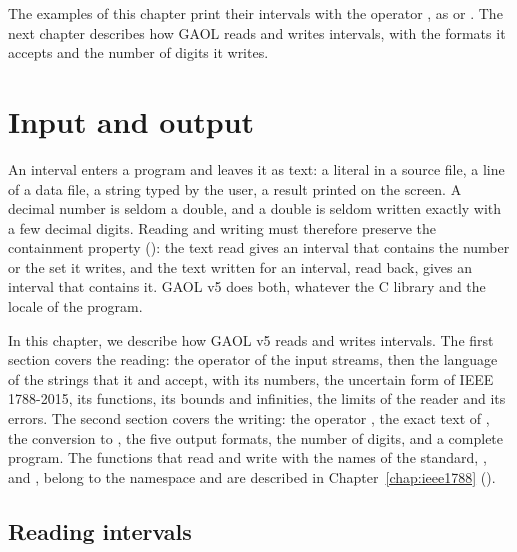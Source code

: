 \documentclass[12pt,a4paper,twoside,openright]{book}
\begin{document}
\medskip
The examples of this chapter print their intervals with the operator
\code{<{}<}, as \code{[4, 4.5]} or \code{[empty]}. The next chapter
describes how GAOL reads and writes intervals, with the formats it accepts
and the number of digits it writes.

\chapter{Input and output}\label{chap:io}

An interval enters a program and leaves it as text: a literal in a source
file, a line of a data file, a string typed by the user, a result printed on
the screen. A decimal number is seldom a double, and a double is seldom
written exactly with a few decimal digits. Reading and writing must therefore
preserve the containment property (): the text read
gives an interval that contains the number or the set it writes, and the text
written for an interval, read back, gives an interval that contains it. GAOL
v5 does both, whatever the C library and the locale of the
program.\newinvfive

\medskip
In this chapter, we describe how GAOL v5 reads and writes intervals. The
first section covers the reading: the operator \code{>{}>} of the input
streams, then the language of the strings that it and 
accept, with its numbers, the uncertain form of IEEE 1788-2015, its functions,
its bounds and infinities, the limits of the reader and its errors. The second
section covers the writing: the operator \code{<{}<}, the exact text of
, the conversion to , the five output
formats, the number of digits, and a complete program. The functions that
read and write with the names of the standard, ,
 and , belong to the namespace
 and are described in Chapter~\ref{chap:ieee1788}
().

\section{Reading intervals}\label{sec:reading-intervals}
\end{document}
